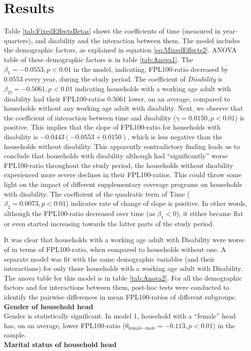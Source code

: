 \documentclass[11pt]{extarticle} %
\begin{document}
\section{Results}
Table \ref{tab:FixedEffectsBetas} shows the coefficients of time (measured in year-quarters), and disability and the interaction between them. The model includes the demographic factors, as explained in equation \ref{eq:MixedEffects2}. ANOVA table of these demographic factors is in table \ref{tab:Anova1}. The $\beta_1 = -0.0553, p < 0.01$ in the model, indicating, FPL100-ratio decreased by $0.0553$ every year, during the study period. The coefficient of {\emph{Disability}} is $\beta_D = -0.5061, p < 0.01$  indicating households with a working age adult with disability had their FPL100-ratios $0.5061$ lower, on an average, compared to households without any working age adult with disability. Next, we observe that the coefficient of interaction between time and disability ($\gamma = 0.0150, p < 0.01$) is positive. This implies that the slope of FPL100-ratio for households with disability is $-0.0443 (-0.0553 + 0.0150)$, which is less negative than the households without disability. This apparently contradictory finding leads us to conclude that households with disability although had ``significantly'' worse FPL100-ratio throughout the study period, the households without disability experienced more severe declines in their FPL100-ratios. This could throw some light on the impact of different supplementary coverage programs on households with disability. The coefficient of the quadratic term of Time ($\beta_2 = 0.0073, p < 0.01$) indicates rate of change of slope is positive. In other words, although the FPL100-ratio decreased over time (as $\beta_1 < 0$), it either became flat or even started increasing towards the latter parts of the study period. 

It was clear that households with a working age adult with Disability were worse of in terms of FPL100-ratio, when compared to households without one. A separate model was fit with the same demographic variables (and their interactions) for only those households with a working age adult with Disability. The anova table for this model is in table \ref{tab:Anova2}. For all the demographic factors and for interactions between them, post-hoc tests were conducted to identify the pairwise differences in mean FPL100-ratios of different subgroups. \\
\noindent
{\bf{Gender of household head}} \\
Gender is statistically significant. In model 1, household with a ``female'' head has, on an average, lower FPL100-ratio ($\theta_{\text{female} - \text{male}} = -0.113, p < 0.01$) in the sample. \\
\noindent
{\bf{Marital status of household head}} \\
\end{document}
